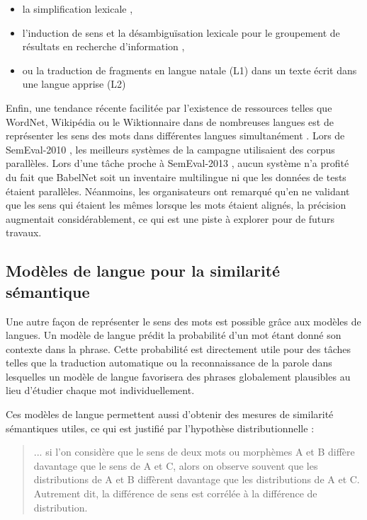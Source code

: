 \begin{itemize}
    \item la simplification lexicale
\citep{specia2012semeval1,fabre2014presentation},
    \item l'induction de sens et la désambiguïsation lexicale pour le
groupement de résultats en recherche d'information \citep{navigli2013semeval11},
    \item ou la traduction de fragments en langue natale (L1) dans un texte
écrit dans une langue apprise (L2) \citep{vangompel2014semeval5}
\end{itemize}

Enfin, une tendance récente facilitée par l'existence de ressources telles que
WordNet, Wikipédia ou le Wiktionnaire dans de nombreuses langues est de
représenter les sens des mots dans différentes langues simultanément
\citep{navigli2013babelnet}. Lors de SemEval-2010 \citep{lefever2010semeval3},
les meilleurs systèmes de la campagne utilisaient des corpus parallèles. Lors
d'une tâche proche à SemEval-2013 \citep{navigli2013semeval12}, aucun système
n'a profité du fait que BabelNet soit un inventaire multilingue ni que les
données de tests étaient parallèles. Néanmoins, les organisateurs ont remarqué
qu'en ne validant que les sens qui étaient les mêmes lorsque les mots étaient
alignés, la précision augmentait considérablement, ce qui est une piste à
explorer pour de futurs travaux.

\subsection{Modèles de langue pour la similarité sémantique}
\label{subsec:modeles_de_langue}

Une autre façon de représenter le sens des mots est possible grâce aux modèles
de langues. Un modèle de langue prédit la probabilité d'un mot étant donné son
contexte dans la phrase. Cette probabilité est directement utile pour des
tâches telles que la traduction automatique ou la reconnaissance de la parole
dans lesquelles un modèle de langue favorisera des phrases globalement
plausibles au lieu d'étudier chaque mot individuellement.

Ces modèles de langue permettent aussi d'obtenir des mesures de similarité
sémantiques utiles, ce qui est justifié par l'hypothèse distributionnelle
\cite[p.~156]{harris1954distributional} :

\begin{quote} ... si l'on considère que le sens de deux mots ou morphèmes A et B
    diffère davantage que le sens de A et C, alors on observe souvent que les
    distributions de A et B diffèrent davantage que les distributions de A et C.
    Autrement dit, la différence de sens est corrélée à la différence de
    distribution. \end{quote}

